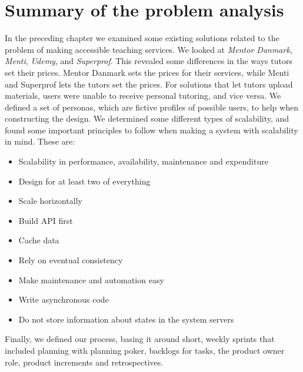 \section{Summary of the problem analysis}
In the preceding chapter we examined some existing solutions related to the problem of making accessible teaching services.
We looked at \textit{Mentor Danmark}, \textit{Menti}, \textit{Udemy}, and \textit{Superprof}.
This revealed some differences in the ways tutors set their prices.
Mentor Danmark sets the prices for their services, while Menti and Superprof lets the tutors set the prices.
For solutions that let tutors upload materials, users were unable to receive personal tutoring, and vice versa.
We defined a set of personas, which are fictive profiles of possible users, to help when constructing the design.
We determined some different types of scalability, and found some important principles to follow when making a system with scalability in mind.
These are:
\begin{itemize}
    \item Scalability in performance, availability, maintenance and expenditure
    \item Design for at least two of everything
    \item Scale horizontally
    \item Build API first
    \item Cache data
    \item Rely on eventual consistency
    \item Make maintenance and automation easy
    \item Write asynchronous code
    \item Do not store information about states in the system servers
\end{itemize}
Finally, we defined our process, basing it around short, weekly sprints that included planning with planning poker, backlogs for tasks, the product owner role, product increments and retrospectives.
